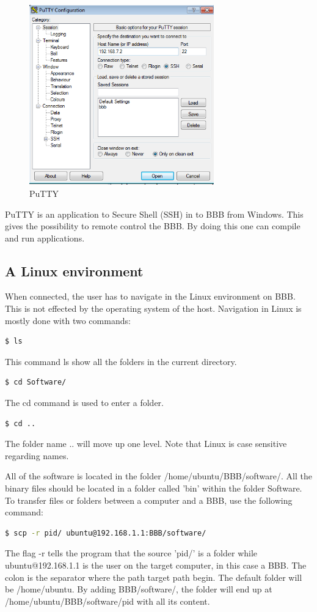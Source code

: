 \begin{figure}[!ht]
	\begin{center}
		\includegraphics[width=80mm]{./Images/Software/Putty.png}
		\caption{PuTTY}
		\label{YourLabel}
	\end{center}
\end{figure}

PuTTY \cite{PuTTY} is an application to Secure Shell (SSH) in to BBB from Windows. This gives the possibility to remote control the BBB. By doing this one can compile and run applications.

\subsection{A Linux environment}

\noindent When connected, the user has to navigate in the Linux environment on BBB. This is not effected by the operating system of the host. Navigation in Linux is mostly done with two commands:
\begin{lstlisting}[language=bash]
  $ ls 
\end{lstlisting}
\noindent This command ls show all the folders in the current directory.
\begin{lstlisting}[language=bash]
  $ cd Software/
\end{lstlisting}
\noindent The cd command is used to enter a folder.
\begin{lstlisting}[language=bash]
  $ cd ..
\end{lstlisting}
\noindent The folder name .. will move up one level. Note that Linux is case sensitive regarding names.

All of the software is located in the folder /home/ubuntu/BBB/software/. All the binary files should be located in a folder called 'bin' within the folder Software. To transfer files or folders between a computer and a BBB, use the following command:
\begin{lstlisting}[language=bash]
  $ scp -r pid/ ubuntu@192.168.1.1:BBB/software/
\end{lstlisting}
\noindent The flag -r tells the program that the source 'pid/' is a folder while ubuntu@192.168.1.1 is the user on the target computer, in this case a BBB. The colon is the separator where the path target path begin. The default folder will be /home/ubuntu. By adding BBB/software/, the folder will end up at /home/ubuntu/BBB/software/pid with all its content.

